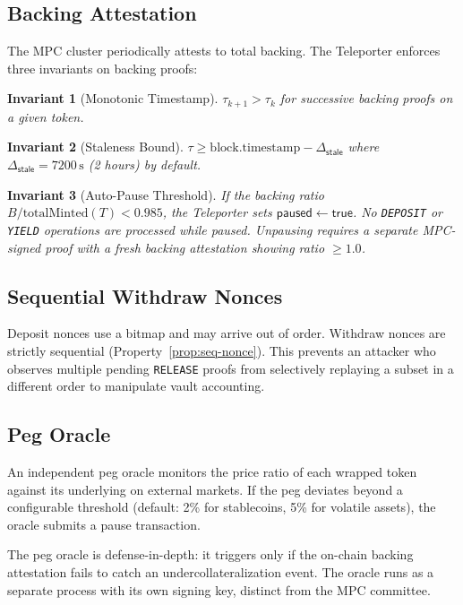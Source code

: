 \documentclass[11pt]{article}
\newtheorem{invariant}{Invariant}
\begin{document}
\subsection{Backing Attestation}

The MPC cluster periodically attests to total backing. The Teleporter enforces three invariants on backing proofs:

\begin{invariant}[Monotonic Timestamp]
$\tau_{k+1} > \tau_k$ for successive backing proofs on a given token.
\end{invariant}

\begin{invariant}[Staleness Bound]
$\tau \geq \mathrm{block.timestamp} - \Delta_{\mathsf{stale}}$ where $\Delta_{\mathsf{stale}} = 7200\,\text{s}$ (2 hours) by default.
\end{invariant}

\begin{invariant}[Auto-Pause Threshold]
If the backing ratio $B / \mathrm{totalMinted}(T) < 0.985$, the Teleporter sets $\mathsf{paused} \leftarrow \mathsf{true}$. No \texttt{DEPOSIT} or \texttt{YIELD} operations are processed while paused. Unpausing requires a separate MPC-signed proof with a fresh backing attestation showing ratio $\geq 1.0$.
\end{invariant}

\subsection{Sequential Withdraw Nonces}

Deposit nonces use a bitmap and may arrive out of order. Withdraw nonces are strictly sequential (Property~\ref{prop:seq-nonce}). This prevents an attacker who observes multiple pending \texttt{RELEASE} proofs from selectively replaying a subset in a different order to manipulate vault accounting.

\subsection{Peg Oracle}

An independent peg oracle monitors the price ratio of each wrapped token against its underlying on external markets. If the peg deviates beyond a configurable threshold (default: 2\% for stablecoins, 5\% for volatile assets), the oracle submits a pause transaction.

The peg oracle is defense-in-depth: it triggers only if the on-chain backing attestation fails to catch an undercollateralization event. The oracle runs as a separate process with its own signing key, distinct from the MPC committee.
\end{document}
